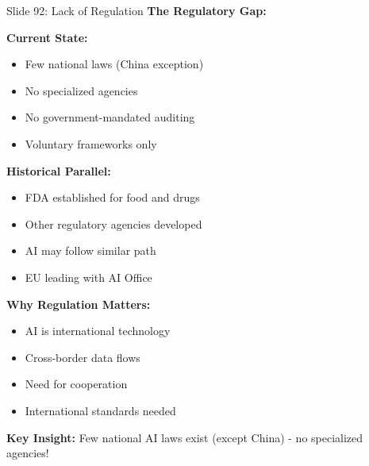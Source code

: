 \documentclass[8pt]{beamer}
\begin{document}
	\begin{frame}{Slide 92: Lack of Regulation}
		\fontsize{6.5}{7.5}\selectfont
		\textbf{The Regulatory Gap:}
		
		\vspace{0.1cm}
		\textbf{Current State:}
		\begin{itemize}
			\item Few national laws (China exception)
			\item No specialized agencies
			\item No government-mandated auditing
			\item Voluntary frameworks only
		\end{itemize}
		
		\vspace{0.1cm}
		\textbf{Historical Parallel:}
		\begin{itemize}
			\item FDA established for food and drugs
			\item Other regulatory agencies developed
			\item AI may follow similar path
			\item EU leading with AI Office
		\end{itemize}
		
		\vspace{0.1cm}
		\textbf{Why Regulation Matters:}
		\begin{itemize}
			\item AI is international technology
			\item Cross-border data flows
			\item Need for cooperation
			\item International standards needed
		\end{itemize}
		
		\textcolor{myblue}{\textbf{Key Insight:}} Few national AI laws exist \textcolor{myblue}{(except China)} - no specialized agencies!
	\end{frame}
	
\end{document}
